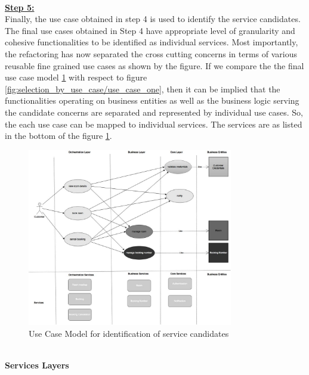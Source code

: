 \\
\textbf{\underline{Step 5:}}
\\
Finally, the use case obtained in step 4 is used to identify the service candidates. The final use cases obtained in Step 4 have appropriate level of granularity and cohesive functionalities to be identified as individual services. Most importantly, the refactoring has now separated the cross cutting concerns in terms of various reusable fine grained use cases as shown by the figure. If we compare the the final use case model \ref{fig:selection_by_use_case/use_case_five} with respect to figure \ref{fig:selection_by_use_case/use_case_one}, then it can be implied that the functionalities operating on business entities as well as the business logic serving the candidate concerns are separated and represented by individual use cases. So, the each use case can be mapped to individual services. The services are as listed in the bottom of the figure \ref{fig:selection_by_use_case/use_case_five}.
\\
\begin{figure}[H]
\begin{center}
\includegraphics[width=0.8\textwidth]{figures/use-case-five}
\caption{Use Case Model for identification of service candidates}
\label{fig:selection_by_use_case/use_case_five}
\end{center}
\end{figure}
\\
\textbf{Services Layers}\\
